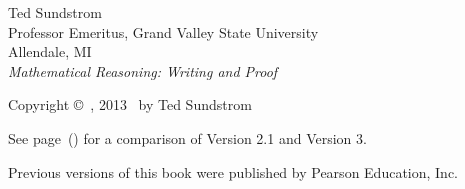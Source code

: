 \newpage
\thispagestyle{empty}

\noindent
Ted Sundstrom \\
Professor Emeritus, Grand Valley State University \\
Allendale, MI\\


\noindent
\emph{Mathematical Reasoning: Writing and Proof}

\noindent
Copyright \copyright \, \the\year, 2013 ~by Ted Sundstrom

\noindent
See page~(\pageref{C:versions}) for a comparison of Version 2.1 and Version 3.

\noindent
Previous versions of this book were published by Pearson Education, Inc.



